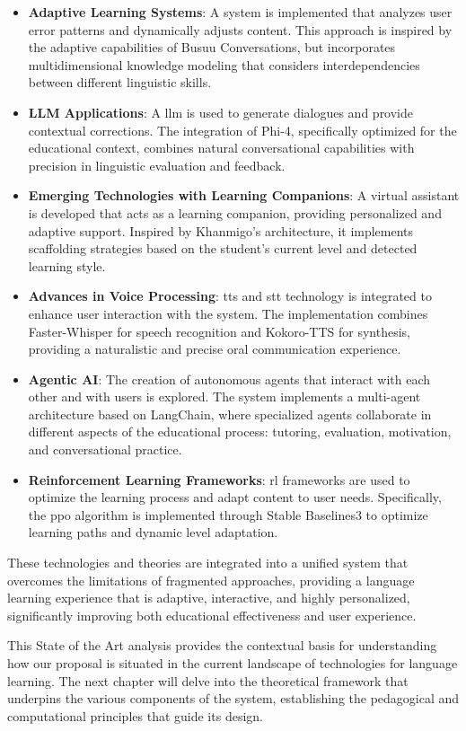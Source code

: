 \begin{itemize}
  \item \textbf{Adaptive Learning Systems}: A system is implemented that analyzes user error patterns and dynamically adjusts content. This approach is inspired by the adaptive capabilities of Busuu Conversations, but incorporates multidimensional knowledge modeling that considers interdependencies between different linguistic skills.
  
  \item \textbf{LLM Applications}: A \gls{llm} is used to generate dialogues and provide contextual corrections. The integration of Phi-4, specifically optimized for the educational context, combines natural conversational capabilities with precision in linguistic evaluation and feedback.
  
  \item \textbf{Emerging Technologies with Learning Companions}: A virtual assistant is developed that acts as a learning companion, providing personalized and adaptive support. Inspired by Khanmigo's architecture, it implements scaffolding strategies based on the student's current level and detected learning style.
  
  \item \textbf{Advances in Voice Processing}: \gls{tts} and \gls{stt} technology is integrated to enhance user interaction with the system. The implementation combines Faster-Whisper for speech recognition and Kokoro-TTS for synthesis, providing a naturalistic and precise oral communication experience.
  
  \item \textbf{Agentic AI}: The creation of autonomous agents that interact with each other and with users is explored. The system implements a multi-agent architecture based on LangChain, where specialized agents collaborate in different aspects of the educational process: tutoring, evaluation, motivation, and conversational practice.
  
  \item \textbf{Reinforcement Learning Frameworks}: \gls{rl} frameworks are used to optimize the learning process and adapt content to user needs. Specifically, the \gls{ppo} algorithm is implemented through Stable Baselines3 to optimize learning paths and dynamic level adaptation.
\end{itemize}

These technologies and theories are integrated into a unified system that overcomes the limitations of fragmented approaches, providing a language learning experience that is adaptive, interactive, and highly personalized, significantly improving both educational effectiveness and user experience.

This State of the Art analysis provides the contextual basis for understanding how our proposal is situated in the current landscape of technologies for language learning. The next chapter will delve into the theoretical framework that underpins the various components of the system, establishing the pedagogical and computational principles that guide its design.